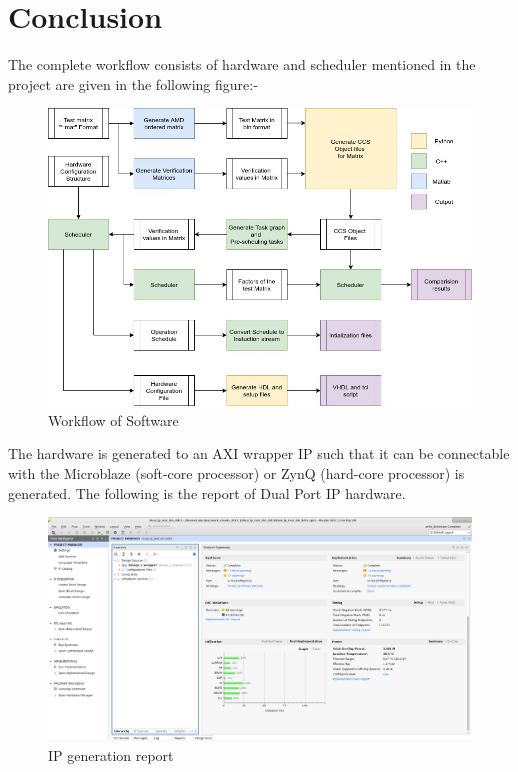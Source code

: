 \chapter{Conclusion}
The complete workflow consists of hardware and scheduler mentioned in the project are given in the following figure:-


\begin{figure}[H]
    \centering
    \includegraphics[width = \textwidth]{./Software/Workflow.jpg}
    \caption{Workflow of Software}
\end{figure}


The hardware is generated to an AXI wrapper IP such that it can be connectable with the Microblaze (soft-core processor)  or  ZynQ (hard-core processor) is generated. The following is the report of Dual Port IP hardware.\\



\begin{figure}[H]
    \centering
    \includegraphics[width = \textwidth]{./Software/Report.png}
    \caption{IP generation report}
\end{figure}


